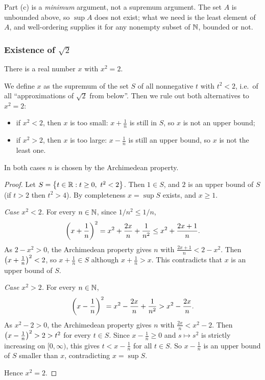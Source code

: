 \begin{remark}
    Part (c) is a \emph{minimum} argument, not a supremum argument. The set
    $A$ is unbounded above, so $\sup A$ does not exist; what we need is the
    least element of $A$, and well-ordering supplies it for any nonempty
    subset of $\mathbb{N}$, bounded or not.
\end{remark}

\subsubsection{Existence of \texorpdfstring{$\sqrt2$}{sqrt 2}}
\begin{proposition}\label{prop:sqrt2-exists}
    There is a real number $x$ with $x^2 = 2$.
\end{proposition}

We define $x$ as the supremum of the set $S$ of all nonnegative $t$ with
$t^2<2$, i.e.\ of all ``approximations of $\sqrt2$ from below''. Then we
rule out both alternatives to $x^2=2$:
\begin{itemize}
    \item if $x^2<2$, then $x$ is too small: $x+\frac1n$ is still in $S$,
    so $x$ is not an upper bound;
    \item if $x^2>2$, then $x$ is too large: $x-\frac1n$ is still an upper
    bound, so $x$ is not the least one.
\end{itemize}
In both cases $n$ is chosen by the Archimedean property.

\begin{proof}
    Let $S = \left\{t \in \mathbb{R} : t \geq 0,\ t^2 < 2\right\}$. Then $1 \in S$, and $2$
    is an upper bound of $S$ (if $t>2$ then $t^2>4$). By completeness
    $x = \sup S$ exists, and $x \geq 1$.

    \emph{Case $x^2 < 2$.} For every $n\in\mathbb{N}$, since $1/n^2\leq 1/n$,
    \begin{equation*}
        \left(x + \frac{1}{n}\right)^2 = x^2 + \frac{2x}{n} + \frac{1}{n^2}
        \leq x^2 + \frac{2x+1}{n}.
    \end{equation*}
    As $2-x^2>0$, the Archimedean property gives $n$ with
    $\frac{2x+1}{n} < 2 - x^2$. Then $\left(x + \frac{1}{n}\right)^2 < 2$, so
    $x+\frac1n\in S$ although $x+\frac1n>x$. This contradicts that $x$ is an
    upper bound of $S$.

    \emph{Case $x^2 > 2$.} For every $n\in\mathbb{N}$,
    \begin{equation*}
        \left(x - \frac{1}{n}\right)^2 = x^2 - \frac{2x}{n} + \frac{1}{n^2}
        > x^2 - \frac{2x}{n}.
    \end{equation*}
    As $x^2-2>0$, the Archimedean property gives $n$ with
    $\frac{2x}{n} < x^2 - 2$. Then $\left(x - \frac{1}{n}\right)^2 > 2 > t^2$
    for every $t\in S$. Since $x-\frac1n\geq0$ and $s\mapsto s^2$ is strictly
    increasing on $[0,\infty)$, this gives $t<x-\frac1n$ for all $t\in S$.
    So $x-\frac1n$ is an upper bound of $S$ smaller than $x$, contradicting
    $x=\sup S$.

    Hence $x^2 = 2$.
\end{proof}

